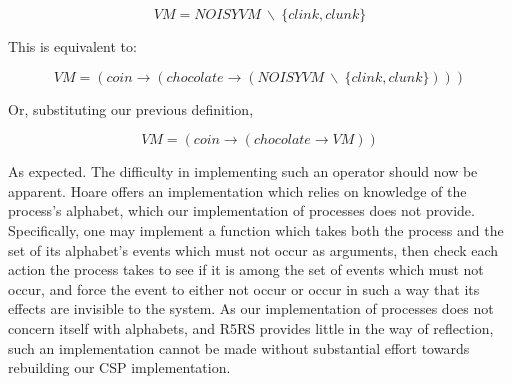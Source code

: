 \documentclass{article}
\begin{document}
\[ VM = NOISYVM\  \backslash\  \{clink,clunk\} \]

This is equivalent to:

\[ VM = (coin \rightarrow (chocolate \rightarrow (NOISYVM\ \backslash \  \{clink,clunk\}))) \]

Or, substituting our previous definition,

\[ VM = (coin \rightarrow (chocolate \rightarrow VM)) \]

As expected. The difficulty in implementing such an operator should now
be apparent. Hoare offers an implementation which relies on knowledge of 
the process's alphabet, which our implementation of processes does not 
provide. Specifically, one may implement a function which takes both the
process and the set of its alphabet's events which must not occur as 
arguments, then check each action the process takes to see if it is among
the set of events which must not occur, and force the event to either
not occur or occur in such a way that its effects are invisible to the 
system. As our implementation of processes does not concern itself with
alphabets, and R5RS provides little in the way of reflection, such an
implementation cannot be made without substantial effort towards rebuilding
our CSP implementation.
\end{document}
